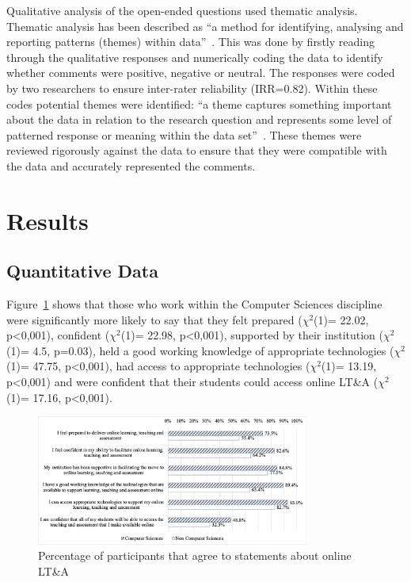 \documentclass[sigconf]{acmart}
\begin{document}
Qualitative analysis of the open-ended questions used thematic
analysis. Thematic analysis has been described as ``a method for
identifying, analysing and reporting patterns (themes) within
data''~\cite[p.78]{braun+clarke:2006}. This was done by firstly
reading through the qualitative responses and numerically coding the
data to identify whether comments were positive, negative or
neutral. The responses were coded by two researchers to ensure
inter-rater reliability (IRR=0.82). Within these codes potential
themes were identified: ``a theme captures something important about
the data in relation to the research question and represents some
level of patterned response or meaning within the data
set''~\cite[p.82]{braun+clarke:2006}. These themes were reviewed
rigorously against the data to ensure that they were compatible with
the data and accurately represented the comments.

\section{Results}\label{results}

\subsection{Quantitative Data}\label{quantdata}

Figure~\ref{fig:partagree} shows that those who work within the
Computer Sciences discipline were significantly more likely to say
that they felt prepared ($\chi^2$(1)= 22.02, p<0,001), confident
($\chi^2$(1)= 22.98, p<0,001), supported by their institution
($\chi^2$(1)= 4.5, p=0.03), held a good working knowledge of
appropriate technologies ($\chi^2$(1)= 47.75, p<0,001), had access to
appropriate technologies ($\chi^2$(1)= 13.19, p<0,001) and were
confident that their students could access online LT\&A ($\chi^2$(1)=
17.16, p<0,001).

\begin{figure}
\includegraphics[width=0.8\textwidth]{images/particagree.png}
\caption{Percentage of participants that agree to statements about
  online LT\&A}
\label{fig:partagree}
\end{figure}
\end{document}
